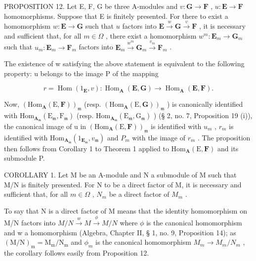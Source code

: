 PROPOSITION 12. Let E, F, G be three A-modules and \(v: \mathbf{G} \to \mathbf{F}\) , \(u: \mathbf{E} \to \mathbf{F}\) homomorphisms. Suppose that E is finitely presented. For there to exist a homomorphism \(w: \mathbf{E} \to \mathbf{G}\) such that \(u\) factors into \(\mathbf{E} \xrightarrow{w} \mathbf{G} \xrightarrow{v} \mathbf{F}\) , it is necessary and sufficient that, for all \(m \in \Omega\) , there exist a homomorphism \(w^m: \mathbf{E}_m \to \mathbf{G}_m\) such that \(u_m: \mathbf{E}_m \to \mathbf{F}_m\) factors into \(\mathbf{E}_m \xrightarrow{w^m} \mathbf{G}_m \xrightarrow{v_m} \mathbf{F}_m\) .

The existence of w satisfying the above statement is equivalent to the following property: u belongs to the image P of the mapping

\[
r = \operatorname{Hom} (1 _ {\mathbf {E}}, v): \operatorname{Hom} _ {\mathbf {A}} (\mathbf {E}, \mathbf {G}) \rightarrow \operatorname{Hom} _ {\mathbf {A}} (\mathbf {E}, \mathbf {F}).
\]

Now, \((\mathrm{Hom}_{\mathbf{A}}(\mathrm{E},\mathbf{F}))_{\mathfrak{m}}\) (resp. \((\mathrm{Hom}_{\mathbf{A}}(\mathrm{E},\mathbf{G}))_{\mathfrak{m}}\) ) is canonically identified with \(\mathrm{Hom}_{\mathbf{A}_{\mathfrak{m}}}(\mathrm{E}_{\mathfrak{m}},\mathrm{F}_{\mathfrak{m}})\) (resp. \(\mathrm{Hom}_{\mathbf{A}_{\mathfrak{m}}}(\mathrm{E}_{\mathfrak{m}},\mathrm{G}_{\mathfrak{m}})\) ) (§ 2, no. 7, Proposition 19 (i)), the canonical image of u in \((\mathrm{Hom}_{\mathbf{A}}(\mathrm{E},\mathbf{F}))_{\mathfrak{m}}\) is identified with \(u_{m}\) , \(r_{m}\) is identified with \(\mathrm{Hom}_{\mathbf{A}_{\mathfrak{m}}}(1_{\mathbf{E}_{\mathfrak{m}}},v_{\mathfrak{m}})\) and \(P_{m}\) with the image of \(r_{m}\) . The proposition then follows from Corollary 1 to Theorem 1 applied to \(\mathrm{Hom}_{\mathbf{A}}(\mathrm{E},\mathbf{F})\) and its submodule P.

COROLLARY 1. Let M be an A-module and N a submodule of M such that M/N is finitely presented. For N to be a direct factor of M, it is necessary and sufficient that, for all \(m \in \Omega\) , \(N_{m}\) be a direct factor of \(M_{m}\) .

To say that N is a direct factor of M means that the identity homomorphism on M/N factors into \(M/N \xrightarrow{w} M \xrightarrow{\phi} M/N\) where \(\phi\) is the canonical homomorphism and w a homomorphism (Algebra, Chapter II, § 1, no. 9, Proposition 14); as \((\mathrm{M}/\mathrm{N})_{\mathrm{m}} = \mathrm{M}_{\mathrm{m}}/\mathrm{N}_{\mathrm{m}}\) and \(\phi_{m}\) is the canonical homomorphism \(M_{m} \to M_{m}/N_{m}\) , the corollary follows easily from Proposition 12.

